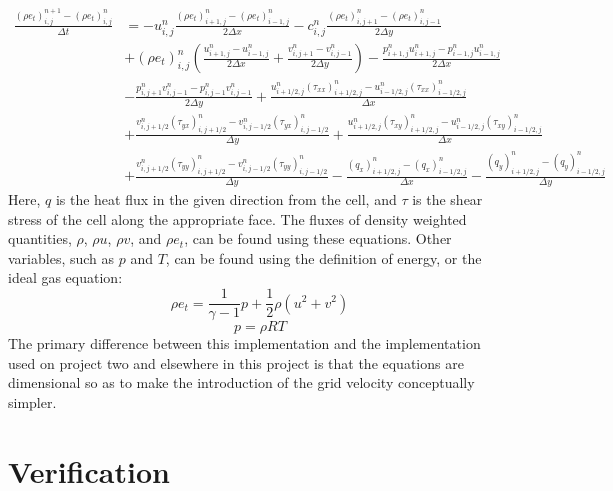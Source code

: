 \documentclass{article}
\begin{document}
\begin{equation}
  \begin{aligned}
    \frac{(\rho e_t)^{n+1}_{i,j} - (\rho e_t)^{n}_{i,j}}{\Delta t} &= - u^{n}_{i,j} \frac{(\rho e_t)^{n}_{i+1,j}-(\rho e_t)^{n}_{i-1,j}}{2\Delta x} - c^{n}_{i,j}\frac{(\rho e_t)^{n}_{i,j+1}-(\rho e_t)^{n}_{i,j-1}}{2\Delta y} \\
    &+ (\rho e_t)^{n}_{i,j} \left(\frac{u^{n}_{i+1,j}-u^{n}_{i-1,j}}{2\Delta x} + \frac{v^{n}_{i,j+1}-v^{n}_{i,j-1}}{2\Delta y}\right) - \frac{p^{n}_{i+1,j}u^{n}_{i+1,j} - p^{n}_{i-1,j} u^{n}_{i-1,j}}{2\Delta x} \\
    &- \frac{p^{n}_{i,j+1} v^{n}_{i,j-1} - p^{n}_{i,j-1} v^{n}_{i,j-1}}{2\Delta y} + \frac{u^{n}_{i+1/2,j}(\tau_{xx})^{n}_{i+1/2,j} - u^{n}_{i-1/2,j} (\tau_{xx})^{n}_{i-1/2,j}}{\Delta x} \\
    &+ \frac{v^{n}_{i,j+1/2} (\tau_{yx})^{n}_{i,j+1/2} - v^{n}_{i,j-1/2} (\tau_{yx})^{n}_{i,j-1/2}}{\Delta y} + \frac{u^{n}_{i+1/2,j} (\tau_{xy})^{n}_{i+1/2,j} - u^{n}_{i-1/2,j}(\tau_{xy})^{n}_{i-1/2,j}}{\Delta x}  \\
    &+ \frac{v^{n}_{i,j+1/2} (\tau_{yy})^{n}_{i,j+1/2} - v^{n}_{i,j-1/2} (\tau_{yy})^{n}_{i,j-1/2}}{\Delta y} - \frac{(q_x)^{n}_{i+1/2,j} - (q_x)^{n}_{i-1/2,j}}{\Delta x} - \frac{(q_y)^{n}_{i+1/2,j} - (q_y)^{n}_{i-1/2,j}}{\Delta y}
  \end{aligned}
\end{equation}
Here, $q$ is the heat flux in the given direction from the cell, and $\tau$ is the shear stress of the cell along the appropriate face.  The fluxes of density weighted quantities, $\rho$, $\rho u$, $\rho v$, and $\rho e_t$, can be found using these equations.  Other variables, such as $p$ and $T$, can be found using the definition of energy, or the ideal gas equation:
\begin{equation}
  \rho e_t = \frac{1}{\gamma -1} p + \frac{1}{2} \rho (u^2 + v^2)
\end{equation}
\begin{equation}
  p = \rho R T
\end{equation}
The primary difference between this implementation and the implementation used on project two and elsewhere in this project is that the equations are dimensional so as to make the introduction of the grid velocity conceptually simpler.

\section{Verification}
\end{document}
